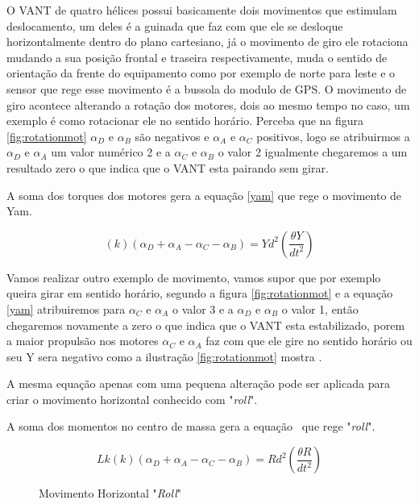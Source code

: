 O VANT de quatro hélices possui basicamente dois movimentos que estimulam deslocamento, um deles é a guinada que faz com que ele se desloque horizontalmente dentro do plano cartesiano, já o movimento de giro ele rotaciona mudando a sua posição frontal e traseira respectivamente, muda o sentido de orientação da frente do equipamento como por exemplo de norte para leste e o sensor que rege esse movimento é a bussola do modulo de GPS. O movimento de giro acontece alterando a rotação dos motores, dois ao mesmo tempo no caso, um exemplo é como rotacionar ele no sentido horário. Perceba que na figura \ref{fig:rotationmot} $\alpha_{D}$ e $\alpha_{B}$ são negativos e $\alpha_{A}$ e $\alpha_{C}$ positivos, logo se atribuirmos a $\alpha_{D}$ e $\alpha_{A}$ um valor numérico 2 e a $\alpha_{C}$ e $\alpha_{B}$ o valor 2 igualmente chegaremos a um resultado zero o que indica que o VANT esta pairando sem girar.  

A soma dos torques dos motores gera a equação \ref{yam} que rege o movimento de Yam. 

\begin{equation}
    \label{yam}
    \left(k\right)\left(\alpha_{D}+\alpha_{A}-\alpha_{C}-\alpha_{B}\right)=Yd^2\left(\frac{\theta Y}{dt^2}\right)
\end{equation}

Vamos realizar outro exemplo de movimento, vamos supor que por exemplo queira girar em sentido horário, segundo a figura \ref{fig:rotationmot} e a equação \ref{yam} atribuiremos para $\alpha_{C}$ e $\alpha_{A}$ o valor 3 e a $\alpha_{D}$ e $\alpha_{B}$ o valor 1, então chegaremos novamente a zero o que indica que o VANT esta estabilizado, porem a maior propulsão nos motores $\alpha_{C}$ e $\alpha_{A}$ faz com que ele gire no sentido horário ou seu Y sera negativo como a ilustração \ref{fig:rotationmot} mostra \cite{momesf}.

A mesma equação apenas com uma pequena alteração pode ser aplicada para criar o movimento horizontal conhecido com "\textit{roll}". 

A soma dos momentos no centro de massa gera a equação \ que rege "\textit{roll}". 

\begin{equation}
    \label{roll}
    Lk\left(k\right)\left(\alpha_{D}+\alpha_{A}-\alpha_{C}-\alpha_{B}\right)=Rd^2\left(\frac{\theta R}{dt^2}\right)
\end{equation}

\begin{figure}[H]
	\centering
	\caption{Movimento Horizontal "\textit{Roll}"}
		\fontsize{9pt}{12pt}\selectfont
	\def\svgwidth{15cm}
	
	\label{fig:roll}
\end{figure}

